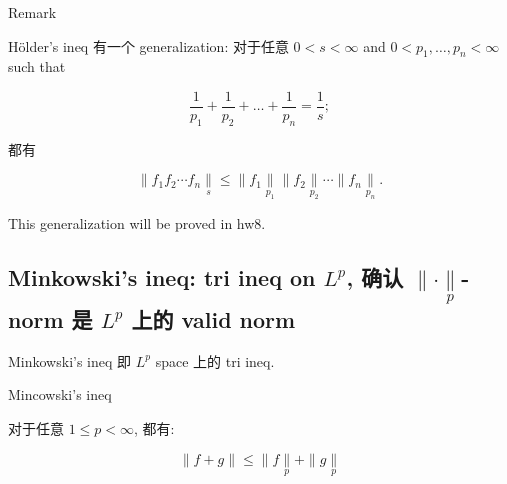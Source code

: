\documentclass{qlnotes-export}
\begin{document}
\begin{qlremark}{Remark}

Hölder's ineq 有一个 generalization: 对于任意 \(0 < s < \infty\) and \(0 < p_{1},\ldots,p_{n} < \infty\) such that

\[\frac{1}{p_{1}} + \frac{1}{p_{2}} + \ldots + \frac{1}{p_{n}} = \frac{1}{s};\]

都有

\[\parallel f_{1}f_{2}\cdots f_{n}\underset{s}{\parallel} \leq \parallel f_{1}\underset{p_{1}}{\parallel} \parallel f_{2}\underset{p_{2}}{\parallel}\cdots \parallel f_{n}\underset{p_{n}}{\parallel}.\]

This generalization will be proved in hw8.

\end{qlremark}

\subsection{\texorpdfstring{Minkowski's ineq: tri ineq on \(L^{p}\), 确认 \(\parallel \cdot \underset{p}{\parallel}\)-norm 是 \(L^{p}\) 上的 valid norm}{Minkowski's ineq: tri ineq on L\^{}\{p\}, 确认 \textbackslash parallel \textbackslash cdot \textbackslash underset\{p\}\{\textbackslash parallel\}-norm 是 L\^{}\{p\} 上的 valid norm}}\label{minkowskis-ineq-tri-ineq-on-lp-ux786eux8ba4-parallel-cdot-undersetpparallel-norm-ux662f-lp-ux4e0aux7684-valid-norm}

Minkowski's ineq 即 \(L^{p}\) space 上的 tri ineq.

\begin{corollary}{Mincowski's ineq}\label{cor-09-l-p-space-and-inequalities-mincowski-s-ineq}

对于任意 \(1 \leq p < \infty\), 都有:

\[\parallel f + g \parallel \leq \parallel f\underset{p}{\parallel} + \parallel g\underset{p}{\parallel}\]

\end{corollary}
\end{document}
